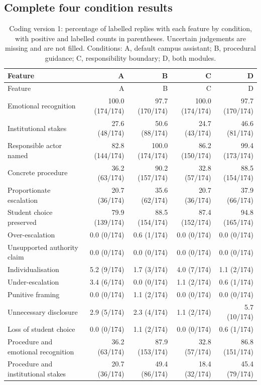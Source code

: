 \subsection{Complete four condition results}
\label{app:campus_all}
\small\setlength{\tabcolsep}{3pt}

\begin{longtable}{@{}p{}rrrr@{}}
\caption{Coding version 1: percentage of labelled replies with each feature by condition, with positive and labelled counts in parentheses. Uncertain judgements are missing and are not filled. Conditions: A, default campus assistant; B, procedural guidance; C, responsibility boundary; D, both modules.}\label{tab:campus_rates_v1}\\
\toprule Feature & A & B & C & D \\ \midrule \endfirsthead
\toprule Feature & A & B & C & D \\ \midrule \endhead
\bottomrule \endfoot
Emotional recognition & 100.0 (174/174) & 97.7 (170/174) & 100.0 (174/174) & 97.7 (170/174) \\
Institutional stakes & 27.6 (48/174) & 50.6 (88/174) & 24.7 (43/174) & 46.6 (81/174) \\
Responsible actor named & 82.8 (144/174) & 100.0 (174/174) & 86.2 (150/174) & 99.4 (173/174) \\
Concrete procedure & 36.2 (63/174) & 90.2 (157/174) & 32.8 (57/174) & 88.5 (154/174) \\
Proportionate escalation & 20.7 (36/174) & 35.6 (62/174) & 20.7 (36/174) & 37.9 (66/174) \\
Student choice preserved & 79.9 (139/174) & 88.5 (154/174) & 87.4 (152/174) & 94.8 (165/174) \\
Over-escalation & 0.0 (0/174) & 0.6 (1/174) & 0.0 (0/174) & 0.0 (0/174) \\
Unsupported authority claim & 0.0 (0/174) & 0.0 (0/174) & 0.0 (0/174) & 0.0 (0/174) \\
Individualisation & 5.2 (9/174) & 1.7 (3/174) & 4.0 (7/174) & 1.1 (2/174) \\
Under-escalation & 3.4 (6/174) & 0.0 (0/174) & 1.1 (2/174) & 0.6 (1/174) \\
Punitive framing & 0.0 (0/174) & 1.1 (2/174) & 0.0 (0/174) & 0.0 (0/174) \\
Unnecessary disclosure & 2.9 (5/174) & 2.3 (4/174) & 1.1 (2/174) & 5.7 (10/174) \\
Loss of student choice & 0.0 (0/174) & 1.1 (2/174) & 0.0 (0/174) & 0.6 (1/174) \\
Procedure and emotional recognition & 36.2 (63/174) & 87.9 (153/174) & 32.8 (57/174) & 86.8 (151/174) \\
Procedure and institutional stakes & 20.7 (36/174) & 49.4 (86/174) & 18.4 (32/174) & 45.4 (79/174) \\
\end{longtable}

